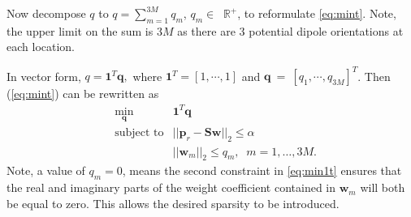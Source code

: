 \documentclass[10pt,final]{IEEEtran}
\begin{document}
Now decompose $q$ to $q=\sum_{m=1}^{3M}q_{m}$,
$q_{m}\in\;\;\mathbb{R}^{+}$, to reformulate \eqref{eq:mint}.  Note, the upper limit on the sum is $3M$ as there are $3$ potential dipole orientations at each location.

In vector form, $q=\textbf{1}^T\textbf{q},$ where $\textbf{1}^T=[1, \cdots, 1]$ and $\textbf{q}~=~[q_{1}, \cdots, q_{3M}]^{T}$.  Then (\ref{eq:mint}) can be rewritten as
\begin{eqnarray}\label{eq:min1t}\nonumber
&\min\limits_{\textbf{q}}& \textbf{1}^T\textbf{q}\\ \nonumber
&\text{subject to}&
    ||\textbf{p}_{r}-\textbf{S}\textbf{w}||_{2}\leq\alpha\\&&
    ||\textbf{w}_{m}||_{2}\leq q_{m},\; \;m=1, \ldots, 3M.
\end{eqnarray}
Note, a value of $q_{m}=0$, means the second constraint in \eqref{eq:min1t} ensures that the real and imaginary parts of the weight coefficient contained in $\textbf{w}_{m}$ will both be equal to zero.  This allows the desired sparsity to be introduced.
\end{document}
